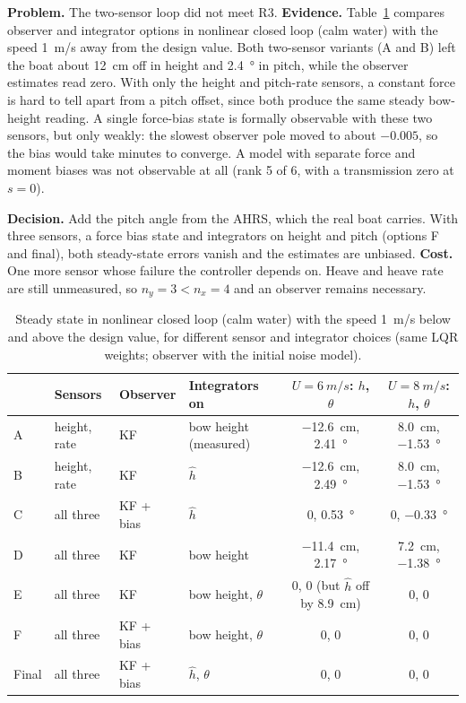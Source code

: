 \documentclass[11pt,a4paper]{article}
\begin{document}
\textbf{Problem.} The two-sensor loop did not meet R3. \textbf{Evidence.}
Table~\ref{tab:biasopts} compares observer and integrator options in nonlinear
closed loop (calm water) with the speed \SI{1}{m/s} away from the design value.
Both two-sensor variants (A and B) left the boat about \SI{12}{cm} off in height
and \SI{2.4}{\degree} in pitch, while the observer estimates read zero. With only
the height and pitch-rate sensors, a constant force is hard to tell apart from a
pitch offset, since both produce the same steady bow-height reading. A single
force-bias state is formally observable with these two sensors, but only
weakly: the slowest observer pole moved to about $-0.005$, so the bias would take
minutes to converge. A model with separate force and moment biases was not
observable at all (rank 5 of 6, with a transmission zero at $s=0$).

\textbf{Decision.} Add the pitch angle from the AHRS, which the real boat
carries. With three sensors, a force bias state and integrators on height and
pitch (options F and final), both steady-state errors vanish and the estimates
are unbiased. \textbf{Cost.} One more sensor whose failure the controller
depends on. Heave and heave rate are still unmeasured, so $n_y=3<n_x=4$ and an
observer remains necessary.

\begin{table}[htbp]
\centering
\small
\caption{Steady state in nonlinear closed loop (calm water) with the speed
\SI{1}{m/s} below and above the design value, for different sensor and integrator
choices (same LQR weights; observer with the initial noise model).}
\label{tab:biasopts}
\begin{tabular}{@{}llllcc@{}}
\toprule
 & Sensors & Observer & Integrators on & $U=\SI{6}{m/s}$: $h$, $\theta$ & $U=\SI{8}{m/s}$: $h$, $\theta$ \\ \midrule
A & height, rate & KF & bow height (measured) & \SI{-12.6}{cm}, \SI{2.41}{\degree} & \SI{8.0}{cm}, \SI{-1.53}{\degree} \\
B & height, rate & KF & $\hat h$ & \SI{-12.6}{cm}, \SI{2.49}{\degree} & \SI{8.0}{cm}, \SI{-1.53}{\degree} \\
C & all three & KF + bias & $\hat h$ & 0, \SI{0.53}{\degree} & 0, \SI{-0.33}{\degree} \\
D & all three & KF & bow height & \SI{-11.4}{cm}, \SI{2.17}{\degree} & \SI{7.2}{cm}, \SI{-1.38}{\degree} \\
E & all three & KF & bow height, $\theta$ & 0, 0 (but $\hat h$ off by \SI{8.9}{cm}) & 0, 0 \\
F & all three & KF + bias & bow height, $\theta$ & 0, 0 & 0, 0 \\
Final & all three & KF + bias & $\hat h$, $\theta$ & 0, 0 & 0, 0 \\
\bottomrule
\end{tabular}
\end{table}
\end{document}
